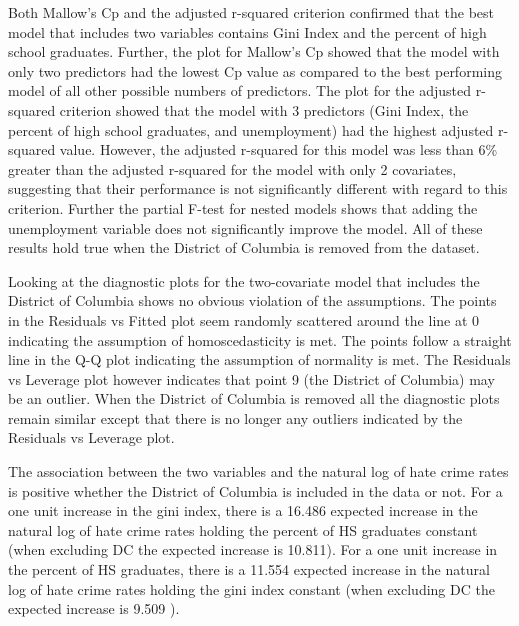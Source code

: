 \documentclass[
]{article}
\begin{document}
Both Mallow's Cp and the adjusted r-squared criterion confirmed that the
best model that includes two variables contains Gini Index and the
percent of high school graduates. Further, the plot for Mallow's Cp
showed that the model with only two predictors had the lowest Cp value
as compared to the best performing model of all other possible numbers
of predictors. The plot for the adjusted r-squared criterion showed that
the model with 3 predictors (Gini Index, the percent of high school
graduates, and unemployment) had the highest adjusted r-squared value.
However, the adjusted r-squared for this model was less than 6\% greater
than the adjusted r-squared for the model with only 2 covariates,
suggesting that their performance is not significantly different with
regard to this criterion. Further the partial F-test for nested models
shows that adding the unemployment variable does not significantly
improve the model. All of these results hold true when the District of
Columbia is removed from the dataset.

Looking at the diagnostic plots for the two-covariate model that
includes the District of Columbia shows no obvious violation of the
assumptions. The points in the Residuals vs Fitted plot seem randomly
scattered around the line at 0 indicating the assumption of
homoscedasticity is met. The points follow a straight line in the Q-Q
plot indicating the assumption of normality is met. The Residuals vs
Leverage plot however indicates that point 9 (the District of Columbia)
may be an outlier. When the District of Columbia is removed all the
diagnostic plots remain similar except that there is no longer any
outliers indicated by the Residuals vs Leverage plot.

The association between the two variables and the natural log of hate
crime rates is positive whether the District of Columbia is included in
the data or not. For a one unit increase in the gini index, there is a
16.486 expected increase in the natural log of hate crime rates holding
the percent of HS graduates constant (when excluding DC the expected
increase is 10.811). For a one unit increase in the percent of HS
graduates, there is a 11.554 expected increase in the natural log of
hate crime rates holding the gini index constant (when excluding DC the
expected increase is 9.509 ).
\end{document}
